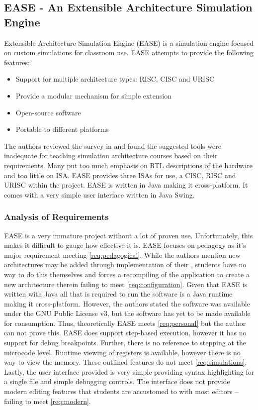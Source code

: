 \subsection{EASE - An Extensible Architecture Simulation Engine}
\label{sec:review-ease}

Extensible Architecture Simulation Engine (EASE) is a simulation engine focused on custom simulations for classroom use\cite{Skillen2011}. EASE attempts to provide the following features: 
\begin{itemize}
    \item Support for multiple architecture types: RISC, CISC and URISC
    \item Provide a modular mechanism for simple extension
    \item Open-source software
    \item Portable to different platforms
\end{itemize}
The authors reviewed the survey in \cite{Nikolic2009} and found the suggested tools were inadequate for teaching simulation architecture courses based on their requirements. Many put too much emphasis on RTL descriptions of the hardware and too little on ISA. EASE provides three ISAs for use, a CISC, RISC and URISC within the project. EASE is written in Java making it cross-platform. It comes with a very simple user interface written in Java Swing. 

\subsubsection*{Analysis of Requirements}

EASE is a very immature project without a lot of proven use. Unfortunately, this makes it difficult to gauge how effective it is. EASE focuses on pedagogy as it's major requirement meeting \cref{req:pedagogical}. While the authors mention new architectures may be added through implementation of their , students have no way to do this themselves and forces a recompiling of the application to create a new architecture therein failing to meet \cref{req:configuration}. Given that EASE is written with Java all that is required to run the software is a Java runtime making it cross-platform. However, the authors stated the software was available under the GNU Public License v3, but the software has yet to be made available for consumption. Thus, theoretically EASE meets \cref{req:personal} but the author can not prove this. EASE does support step-based execution, however it has no support for debug breakpoints. Further, there is no reference to stepping at the microcode level. Runtime viewing of registers is available, however there is no way to view the memory. These outlined features do not meet \cref{req:simulations}. Lastly, the user interface provided is very simple providing syntax highlighting for a single file and simple debugging controls. The interface does not provide modern editing features that students are accustomed to with most editors -- failing to meet \cref{req:modern}.

